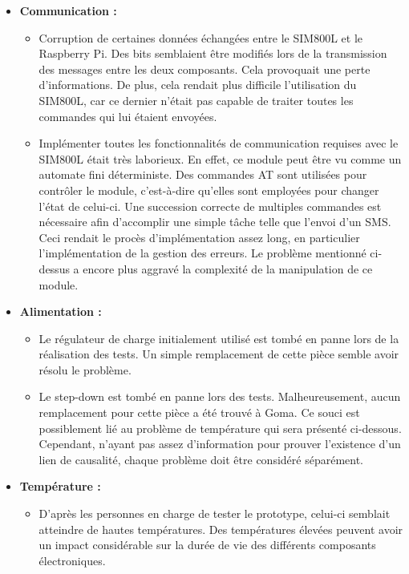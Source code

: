 \begin{itemize}
  \item \textbf{Communication :}
  \begin{itemize}
    \item Corruption de certaines données échangées entre le SIM800L et le Raspberry Pi. Des bits semblaient être modifiés lors de la transmission des messages entre les deux composants. Cela provoquait une perte d'informations. De plus, cela rendait plus difficile l'utilisation du SIM800L, car ce dernier n'était pas capable de traiter toutes les commandes qui lui étaient envoyées.

    \item Implémenter toutes les fonctionnalités de communication requises avec le SIM800L était très laborieux. En effet, ce module peut être vu comme un automate fini déterministe. Des commandes AT sont utilisées pour contrôler le module, c'est-à-dire qu'elles sont employées pour changer l'état de celui-ci. Une succession correcte de multiples commandes est nécessaire afin d'accomplir une simple tâche telle que l'envoi d'un SMS. Ceci rendait le procès d'implémentation assez long, en particulier l'implémentation de la gestion des erreurs. Le problème mentionné ci-dessus a encore plus aggravé la complexité de la manipulation de ce module.
  \end{itemize}

  \item \textbf{Alimentation :}
  \begin{itemize}
    \item Le régulateur de charge initialement utilisé est tombé en panne lors de la réalisation des tests. Un simple remplacement de cette pièce semble avoir résolu le problème.

    \item Le step-down est tombé en panne lors des tests. Malheureusement, aucun remplacement pour cette pièce a été trouvé à Goma. Ce souci est possiblement lié au problème de température qui sera présenté ci-dessous. Cependant, n'ayant pas assez d'information pour prouver l'existence d'un lien de causalité, chaque problème doit être considéré séparément.
  \end{itemize}

  \item \textbf{Température :}
  \begin{itemize}
    \item D'après les personnes en charge de tester le prototype, celui-ci semblait atteindre de hautes températures. Des températures élevées peuvent avoir un impact considérable sur la durée de vie des différents composants électroniques.
  \end{itemize}
\end{itemize}

